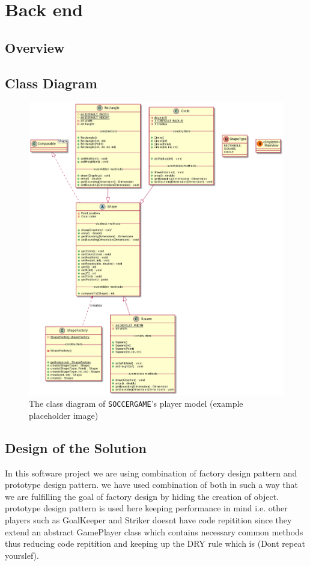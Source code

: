 \documentclass[12pt, dvipsnames, a4paper]{article}
\newcommand{\code}[1]{\texttt{#1}}
\begin{document}
\clearpage

\section{Back end}
\subsection{Overview}

\subsection{Class Diagram}
\begin{center}
	\begin{figure}[H]
		\hspace{30pt}
		\includegraphics[scale=.5]{diagrams/class-diagrams/shape-model/shape-model-alt-cd.png}
		\caption{The class diagram of \code{SOCCERGAME}'s player model (example placeholder image)}
		\label{fig:backend}
	\end{figure}
\end{center}
\clearpage
\subsection{Design of the Solution} 
In this software project we are using combination of factory design pattern and prototype design pattern. 
we have used combination of both in such a way that we are fulfilling the goal of factory design by hiding the 
creation of object. prototype design pattern is used here keeping performance in mind i.e. other players such as
GoalKeeper and Striker doesnt have code repitition since they extend an abstract GamePlayer class which contains
necessary common methods thus reducing code repitition and keeping up the DRY rule which is (Dont repeat yourslef).
\end{document}
